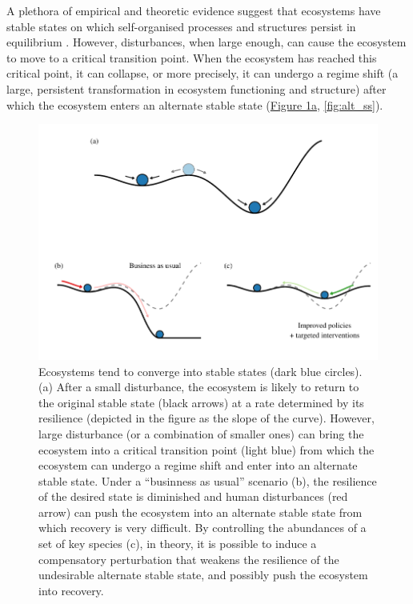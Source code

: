 \documentclass[a4paper]{article}
\begin{document}
A plethora of empirical and theoretic evidence suggest that ecosystems have stable states on which self-organised processes and structures persist in equilibrium \cite{Gunderson2000,Ives2007}.
However, disturbances, when large enough, can cause the ecosystem to move to a critical transition point.
When the ecosystem has reached this critical point, it can collapse, or more precisely, it can undergo a regime shift (a large, persistent transformation in ecosystem functioning and structure) after which the ecosystem enters an alternate stable state \cite{Holling1973,May1976, Gunderson2000} (\hyperref[fig:critical_tran]{Figure \ref{fig:critical_tran}a}, \ref{fig:alt_ss}).


\begin{figure}[p]
  \centering
  \includegraphics{critical_tran}
  \caption{
  \label{fig:critical_tran}
  Ecosystems tend to converge into stable states (dark blue circles).
  (a) After a small disturbance, the ecosystem is likely to return to the original stable state (black arrows) at a rate determined by its resilience (depicted in the figure as the slope of the curve).
  However, large disturbance (or a combination of smaller ones) can bring the ecosystem into a critical transition point (light blue) from which the ecosystem can undergo a regime shift and enter into an alternate stable state.
  Under a ``businness as usual'' scenario (b), the resilience of the desired state is diminished and human disturbances (red arrow) can push the ecosystem into an alternate stable state from which recovery is very difficult.
  By controlling the abundances of a set of key species (c), in theory, it is possible to induce a compensatory perturbation that weakens the resilience of the undesirable alternate stable state, and possibly push the ecosystem into recovery.
  }
\end{figure}
\end{document}
